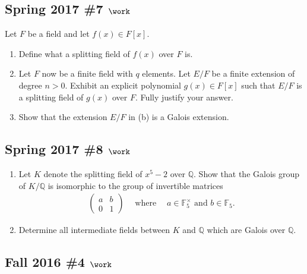 \hypertarget{spring-2017-7-work}{%
\subsection{\texorpdfstring{Spring 2017 \#7
\(\work\)}{Spring 2017 \#7 \textbackslash work}}\label{spring-2017-7-work}}

Let \(F\) be a field and let \(f(x) \in F[x]\).

\begin{enumerate}
\def\labelenumi{\alph{enumi}.}
\item
  Define what a splitting field of \(f(x)\) over \(F\) is.
\item
  Let \(F\) now be a finite field with \(q\) elements. Let \(E/F\) be a
  finite extension of degree \(n>0\). Exhibit an explicit polynomial
  \(g(x) \in F[x]\) such that \(E/F\) is a splitting field of \(g(x)\)
  over \(F\). Fully justify your answer.
\item
  Show that the extension \(E/F\) in (b) is a Galois extension.
\end{enumerate}

\hypertarget{spring-2017-8-work}{%
\subsection{\texorpdfstring{Spring 2017 \#8
\(\work\)}{Spring 2017 \#8 \textbackslash work}}\label{spring-2017-8-work}}

\begin{enumerate}
\def\labelenumi{\alph{enumi}.}
\item
  Let \(K\) denote the splitting field of \(x^5 - 2\) over
  \({\mathbb{Q}}\). Show that the Galois group of \(K/{\mathbb{Q}}\) is
  isomorphic to the group of invertible matrices
  \begin{align*}
  \left(\begin{array}{ll}
  a & b \\
  0 & 1
  \end{array}\right) 
  {\quad \operatorname{where} \quad} a\in {\mathbb{F}}_5^{\times}\text{ and } b\in {\mathbb{F}}_5
  .\end{align*}
\item
  Determine all intermediate fields between \(K\) and \({\mathbb{Q}}\)
  which are Galois over \({\mathbb{Q}}\).
\end{enumerate}

\hypertarget{fall-2016-4-work}{%
\subsection{\texorpdfstring{Fall 2016 \#4
\(\work\)}{Fall 2016 \#4 \textbackslash work}}\label{fall-2016-4-work}}


